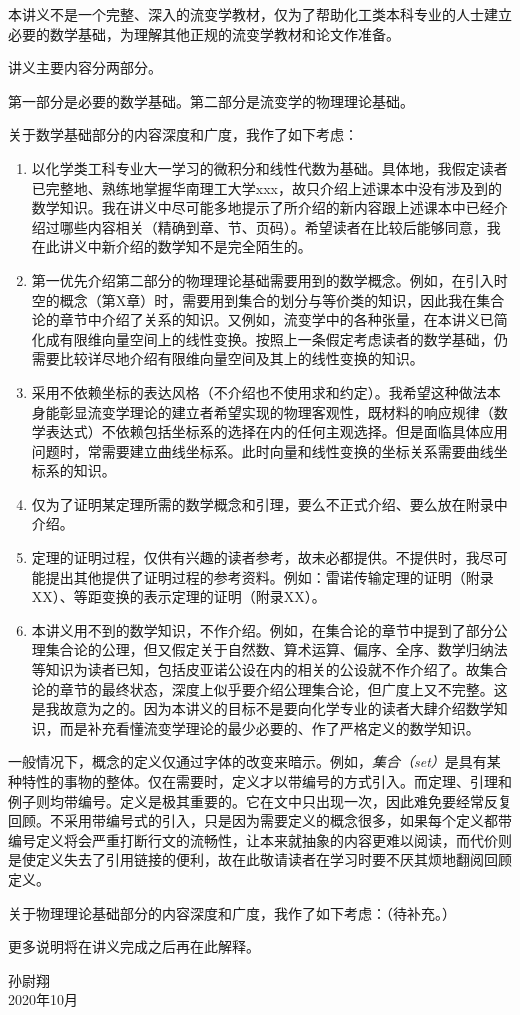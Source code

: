 \documentclass[main.tex]{subfiles}
\begin{document}
本讲义不是一个完整、深入的流变学教材，仅为了帮助化工类本科专业的人士建立必要的数学基础，为理解其他正规的流变学教材和论文作准备。

讲义主要内容分两部分。

第一部分是必要的数学基础。第二部分是流变学的物理理论基础。

关于数学基础部分的内容深度和广度，我作了如下考虑：
\begin{enumerate}
    \item 以化学类工科专业大一学习的微积分和线性代数为基础。具体地，我假定读者已完整地、熟练地掌握华南理工大学xxx，故只介绍上述课本中没有涉及到的数学知识。我在讲义中尽可能多地提示了所介绍的新内容跟上述课本中已经介绍过哪些内容相关（精确到章、节、页码）。希望读者在比较后能够同意，我在此讲义中新介绍的数学知不是完全陌生的。
    \item 第一优先介绍第二部分的物理理论基础需要用到的数学概念。例如，在引入时空的概念（第X章）时，需要用到集合的划分与等价类的知识，因此我在集合论的章节中介绍了关系的知识。又例如，流变学中的各种张量，在本讲义已简化成有限维向量空间上的线性变换。按照上一条假定考虑读者的数学基础，仍需要比较详尽地介绍有限维向量空间及其上的线性变换的知识。
    \item 采用不依赖坐标的表达风格（不介绍也不使用求和约定）。我希望这种做法本身能彰显流变学理论的建立者希望实现的物理客观性，既材料的响应规律（数学表达式）不依赖包括坐标系的选择在内的任何主观选择。但是面临具体应用问题时，常需要建立曲线坐标系。此时向量和线性变换的坐标关系需要曲线坐标系的知识。
    \item 仅为了证明某定理所需的数学概念和引理，要么不正式介绍、要么放在附录中介绍。
    \item 定理的证明过程，仅供有兴趣的读者参考，故未必都提供。不提供时，我尽可能提出其他提供了证明过程的参考资料。例如：雷诺传输定理的证明（附录XX）、等距变换的表示定理的证明（附录XX）。
    \item 本讲义用不到的数学知识，不作介绍。例如，在集合论的章节中提到了部分公理集合论的公理，但又假定关于自然数、算术运算、偏序、全序、数学归纳法等知识为读者已知，包括皮亚诺公设在内的相关的公设就不作介绍了。故集合论的章节的最终状态，深度上似乎要介绍公理集合论，但广度上又不完整。这是我故意为之的。因为本讲义的目标不是要向化学专业的读者大肆介绍数学知识，而是补充看懂流变学理论的最少必要的、作了严格定义的数学知识。
\end{enumerate}

一般情况下，概念的定义仅通过字体的改变来暗示。例如，\emph{集合（set）}是具有某种特性的事物的整体。仅在需要时，定义才以带编号的方式引入。而定理、引理和例子则均带编号。定义是极其重要的。它在文中只出现一次，因此难免要经常反复回顾。不采用带编号式的引入，只是因为需要定义的概念很多，如果每个定义都带编号定义将会严重打断行文的流畅性，让本来就抽象的内容更难以阅读，而代价则是使定义失去了引用链接的便利，故在此敬请读者在学习时要不厌其烦地翻阅回顾定义。

关于物理理论基础部分的内容深度和广度，我作了如下考虑：（待补充。）

更多说明将在讲义完成之后再在此解释。
\begin{flushright}
孙尉翔\\
2020年10月
\end{flushright}
\end{document}
